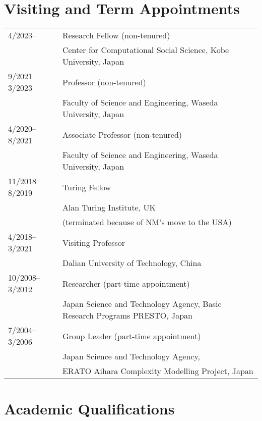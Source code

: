 \documentclass[11pt,letter]{article}
\begin{document}
\section*{\bf \normalsize Visiting and Term Appointments}
\begin{tabular}{ll}
4/2023-- & Research Fellow (non-tenured)\\
& Center for Computational Social Science, Kobe University, Japan\\[1.5mm]
%
%
%
9/2021--3/2023 & Professor (non-tenured)\\
& Faculty of Science and Engineering, Waseda University, Japan\\[1.5mm]
%
4/2020--8/2021 & Associate Professor (non-tenured)\\
& Faculty of Science and Engineering, Waseda University, Japan\\[1.5mm]
%
%
11/2018--8/2019 & Turing Fellow\\
& Alan Turing Institute, UK\\
& (terminated because of NM's move to the USA)\\[1.5mm]
%
4/2018--3/2021 & Visiting Professor\\
& Dalian University of Technology, China\\[1.5mm]
%
%
10/2008--3/2012 & Researcher (part-time appointment)\\
& Japan Science and Technology Agency, Basic Research Programs PRESTO, Japan\\[1.5mm]
%
7/2004--3/2006 & Group Leader (part-time appointment)\\
& Japan Science and Technology Agency,\\
& ERATO Aihara Complexity Modelling Project, Japan
\end{tabular}

\section*{\bf \normalsize Academic Qualifications}
\end{document}
